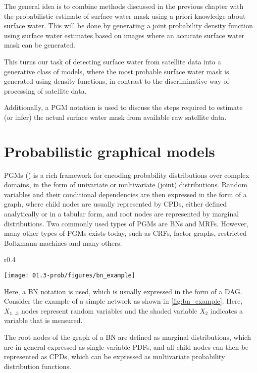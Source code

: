 The general idea is to combine methods discussed in the previous chapter with the probabilistic estimate of surface water mask using a priori knowledge about surface water. This will be done by generating a joint probability density function using surface water estimates based on images where an accurate surface water mask can be generated. 

This turns our task of detecting surface water from satellite data into a generative class of models, where the most probable surface water mask is generated using density functions, in contrast to the discriminative way of processing of satellite data. 

Additionally, a \gls{PGM} notation is used to discuss the steps required to estimate (or infer) the actual surface water mask from available raw satellite data.

\section{Probabilistic graphical models}

\glspl{PGM} (\cite{koller2009probabilistic}) is a rich framework for encoding probability distributions over complex domains, in the form of univariate or multivariate (joint) distributions. Random variables and their conditional dependencies are then expressed in the form of a graph, where child nodes are usually represented by \glspl{CPD}, either defined analytically or in a tabular form, and root nodes are represented by marginal distributions. Two commonly used types of \glspl{PGM} are \glspl{BN} and \glspl{MRF}. However, many other types of \glspl{PGM} exists today, such as \glspl{CRF}, factor graphs, restricted Boltzmann machines and many others.

\begin{wrapfigure}{r}{0.4\textwidth}
	\begin{center}
		\texttt{[image: 01.3-prob/figures/bn\_example]} 
	\end{center}
	\caption{A simple Bayesian network.}
	\label{fig:bn_example}
\end{wrapfigure}

Here, a \gls{BN} notation is used, which is usually expressed in the form of a \gls{DAG}. Consider the example of a simple network as shown in \ref{fig:bn_example}. Here, $X_{1...3}$ nodes represent random variables and the shaded variable $X_2$ indicates a variable that is measured. 

The root nodes of the graph of a BN are defined as marginal distributions, which are in general expressed as single-variable \glspl{PDF}, and all child nodes can then be represented as \glspl{CPD}, which can be expressed as multivariate probability distribution functions. 

